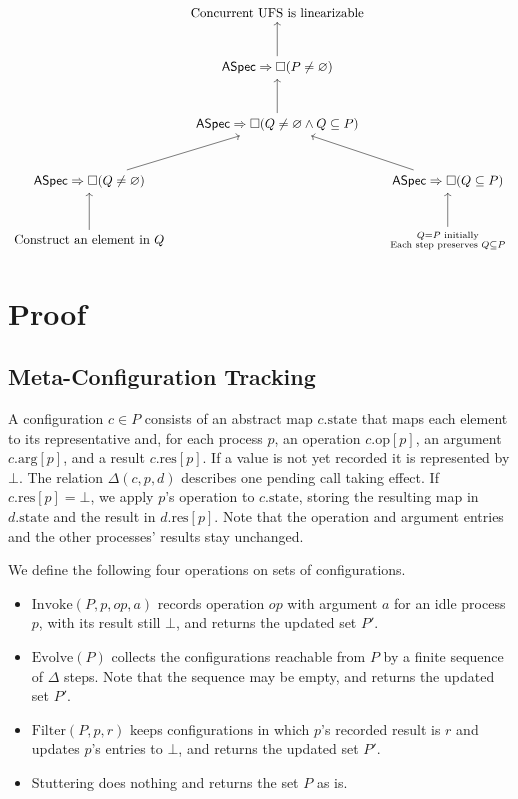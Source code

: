 \documentclass[12pt]{amsproc}
\begin{document}
\[
\begin{tikzcd}[column sep=small, row sep=large]
    & \text{Concurrent UFS is linearizable} & \\
    & \mathsf{ASpec} \Rightarrow \Box(P \ne \varnothing)
        \arrow[u] & \\
    & \mathsf{ASpec} \Rightarrow
        \Box(Q \ne \varnothing \land Q \subseteq P)
        \arrow[u] & \\
    \mathsf{ASpec} \Rightarrow \Box(Q \ne \varnothing)
        \arrow[ur]
    &&
    \mathsf{ASpec} \Rightarrow \Box(Q \subseteq P)
        \arrow[ul] \\
    \text{Construct an element in } Q
        \arrow[u]
    &&
    \substack{Q=P \text{ initially}\\
          \text{Each step preserves } Q\subseteq P}
    \arrow[u]
\end{tikzcd}
\]

\newpage 

\section{Proof}

\subsection{Meta-Configuration Tracking}

\bbni

A configuration $c \in P$ consists of an abstract map $c.\mathrm{state}$ that maps each element to its representative and, for each process $p$, an operation $c.\mathrm{op}[p]$, an argument $c.\mathrm{arg}[p]$, and a result $c.\mathrm{res}[p]$. If a value is not yet recorded it is represented by $\bot$.  The relation $\Delta(c,p,d)$ describes one pending call taking effect. If \(c.\mathrm{res}[p]=\bot\), we apply \(p\)’s operation to \(c.\mathrm{state}\), storing the resulting map in \(d.\mathrm{state}\) and the result in \(d.\mathrm{res}[p]\). Note that the operation and argument entries and the other processes' results stay unchanged.


We define the following four operations on sets of configurations.
\begin{itemize}
    \item $\mathrm{Invoke}(P,p,op,a)$ records operation $op$ with argument $a$ for an idle process $p$, with its result still $\bot$, and returns the updated set $P'$.
    \item $\mathrm{Evolve}(P)$ collects the configurations reachable from $P$ by a finite sequence of $\Delta$ steps. Note that the sequence may be empty, and returns the updated set $P'$. 
    \item $\mathrm{Filter}(P,p,r)$ keeps configurations in which $p$'s recorded result is $r$ and updates $p$'s entries to $\bot$, and returns the updated set $P'$. 
    \item Stuttering does nothing and returns the set $P$ as is. 
\end{itemize}
\end{document}
